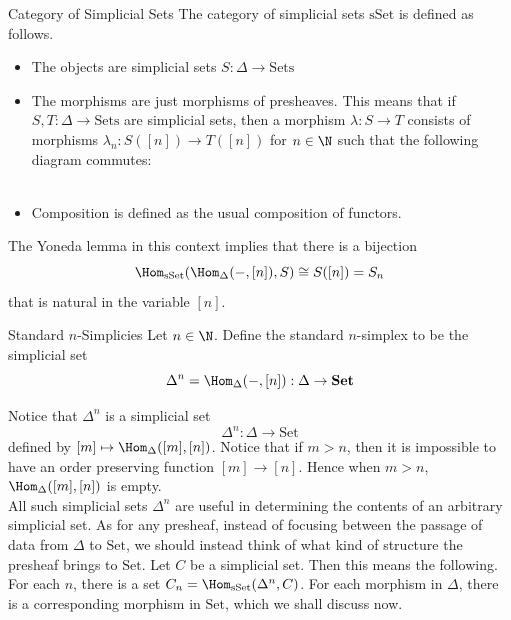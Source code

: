 \documentclass[a4paper]{article}
\begin{document}
\begin{defn}{Category of Simplicial Sets}{} The category of simplicial sets $\text{sSet}$ is defined as follows. 
\begin{itemize}
\item The objects are simplicial sets $S:\Delta\to\text{Sets}$
\item The morphisms are just morphisms of presheaves. This means that if $S,T:\Delta\to\text{Sets}$ are simplicial sets, then a morphism $\lambda:S\to T$ consists of morphisms $\lambda_n:S([n])\to T([n])$ for $n\in\N$ such that the following diagram commutes: \\~\\
\item Composition is defined as the usual composition of functors. 
\end{itemize}
\end{defn}

The Yoneda lemma in this context implies that there is a bijection $$\Hom_{\text{sSet}}(\Hom_\Delta(-,[n]),S)\cong S([n])=S_n$$ that is natural in the variable $[n]$. 

\begin{defn}{Standard $n$-Simplicies}{} Let $n\in\N$. Define the standard $n$-simplex to be the simplicial set $$\Delta^n=\Hom_\Delta(-,[n]):\Delta\to\bold{Set}$$
\end{defn}

Notice that $\Delta^n$ is a simplicial set $$\Delta^n:\Delta\to\text{Set}$$ defined by $[m]\mapsto\Hom_\Delta([m],[n])$. Notice that if $m>n$, then it is impossible to have an order preserving function $[m]\to[n]$. Hence when $m>n$, $\Hom_\Delta([m],[n])$ is empty. \\

All such simplicial sets $\Delta^n$ are useful in determining the contents of an arbitrary simplicial set. As for any presheaf, instead of focusing between the passage of data from $\Delta$ to $\text{Set}$, we should instead think of what kind of structure the presheaf brings to $\text{Set}$. Let $C$ be a simplicial set. Then this means the following. For each $n$, there is a set $C_n=\Hom_\text{sSet}(\Delta^n,C)$. For each morphism in $\Delta$, there is a corresponding morphism in $\text{Set}$, which we shall discuss now. 
\end{document}
